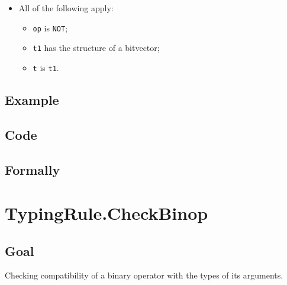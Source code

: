 \documentclass{book}
\begin{document}
\begin{itemize}
  \item All of the following apply:
    \begin{itemize}
    \item \texttt{op} is \texttt{NOT};
    \item \texttt{t1} has the structure of a bitvector;
    \item \texttt{t} is \texttt{t1}.
    \end{itemize}
  \end{itemize}

  \subsection{Example}

  \subsection{Code}

\begin{emptyformal}
    \subsection{Formally}
\end{emptyformal}


\section{TypingRule.CheckBinop \label{sec:TypingRule.CheckBinop}}

\subsection{Goal}
  Checking compatibility of a binary operator with the types of its arguments.
\end{document}
